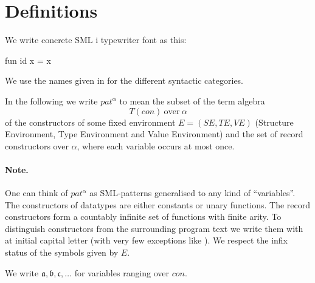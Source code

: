 \section{Definitions}
We write concrete SML i typewriter font as this:
\begin{sml}
fun id x = x
\end{sml}

We use the names given in \cite{SML97} for the different syntactic categories.

\begin{definition}
  In the following we write $pat^\alpha$ to mean the subset of the term algebra
  \[
  T(con)\ \text{over}\ \alpha
  \]
  of the constructors of some fixed environment $E = (S\!E, T\!E, V\!E)$
  (Structure Environment, Type Environment and Value Environment) and the set of
  record constructors over $\alpha$, where each variable occurs at most
  once. 

\end{definition}

\paragraph{Note.} One can think of $pat^\alpha$ as SML-patterns generalised to
any kind of ``variables''. The constructors of datatypes are either constants or
unary functions. The record constructors form a countably infinite set of
functions with finite arity. To distinguish constructors from the surrounding
program text we write them with at initial capital letter (with very few
exceptions like \codeinline{::} ). We respect the infix status
of the symbols given by $E$.

We write $\mathfrak{a}, \mathfrak{b}, \mathfrak{c}, \ldots$ for variables
ranging over $con$.




